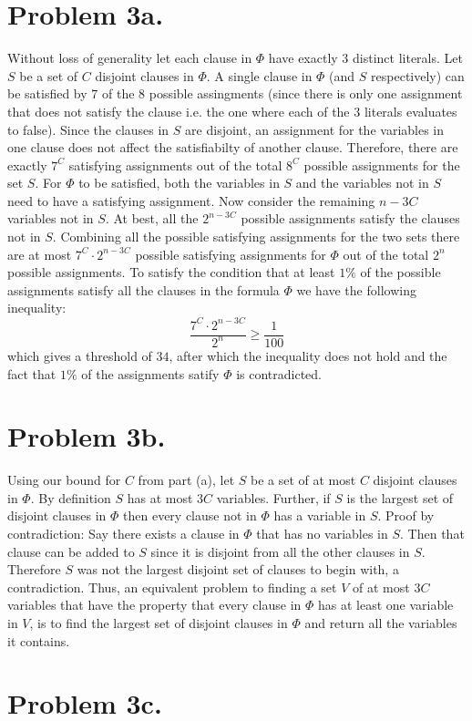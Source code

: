 \documentclass[12pt]{article}
\begin{document}
\pagestyle{plain}
\titleformat{\subsection}[runin]
  {\normalfont\large\bfseries}{\thesubsection}{1em}{}
\titleformat{\subsubsection}[runin]
  {\normalfont\large\bfseries}{\thesubsubsection}{1em}{}

\section*{Problem 3a.}
Without loss of generality let each clause in $\Phi$ have exactly $3$
distinct literals. Let $S$ be a set of $C$ disjoint clauses in $\Phi$.
A single clause in $\Phi$ (and $S$ respectively) can be satisfied by $7$ of the
$8$ possible assingments (since there is only one assignment that does
not satisfy the clause i.e. the one where each of the $3$ literals evaluates to
false). Since the clauses in $S$ are disjoint, an assignment for the variables
in one clause does not affect the satisfiabilty of another clause. Therefore,
there are exactly $7^C$ satisfying assignments out of the total $8^C$ possible
assignments for the set $S$. For $\Phi$ to be satisfied, both the variables in
$S$ and the variables not in $S$ need to have a satisfying assignment. Now
consider the remaining $n-3C$ variables not in $S$. At best, all the $2^{n-3C}$
possible assignments satisfy the clauses not in $S$. Combining all the possible
satisfying assignments for the two sets there are at most $7^C \cdot 2^{n-3C}$
possible satisfying assignments for $\Phi$ out of the total $2^n$ possible
assignments. To satisfy the condition that at least $1\%$ of the possible
assignments satisfy all the clauses in the formula $\Phi$ we have the following
inequality:
$$\frac{7^C \cdot 2^{n-3C}}{2^n} \ge \frac{1}{100} $$
which gives a threshold of $34$, after which the inequality does not hold
and the fact that $1\%$ of the assignments satify $\Phi$ is contradicted.

\section*{Problem 3b.}
Using our bound for $C$ from part (a), let $S$ be a set of at most $C$ disjoint
clauses in $\Phi$. By definition $S$ has at most  $3C$ variables. Further, if
$S$ is the largest set of disjoint clauses in $\Phi$ then every clause not in
$\Phi$ has a variable in $S$. Proof by contradiction: Say there exists a clause
in $\Phi$ that has no variables in $S$. Then that clause can be added to $S$
since it is disjoint from all the other clauses in $S$. Therefore $S$ was not
the largest disjoint set of clauses to begin with, a contradiction. Thus, an
equivalent problem to finding a set $V$ of at most $3C$ variables that have the
property that every clause in $\Phi$ has at least one variable in $V$, is to
find the largest set of disjoint clauses in $\Phi$ and return all the variables
it contains.


\section*{Problem 3c.}
\end{document}
